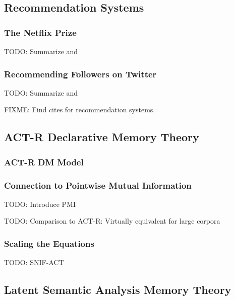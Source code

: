 \documentclass[man]{apa6}
\begin{document}
\subsection{Recommendation Systems}

\subsubsection{The Netflix Prize}

TODO: Summarize and \cite{Bennett2007}

\subsubsection{Recommending Followers on Twitter}

TODO: Summarize and \cite{Hannon2010}

FIXME: Find cites for recommendation systems.

\subsection{ACT-R Declarative Memory Theory}

\cite{Anderson2004}

\subsubsection{ACT-R DM Model}

\subsubsection{Connection to Pointwise Mutual Information}

TODO: Introduce PMI \cite{Farahat2004}

TODO: Comparison to ACT-R: Virtually equivalent for large corpora \cite{Farahat2004}

\subsubsection{Scaling the Equations}

\cite{Douglass2010}

TODO: SNIF-ACT \cite{Fu2007} \cite{Pirolli2003}

\subsection{Latent Semantic Analysis Memory Theory}
\end{document}
